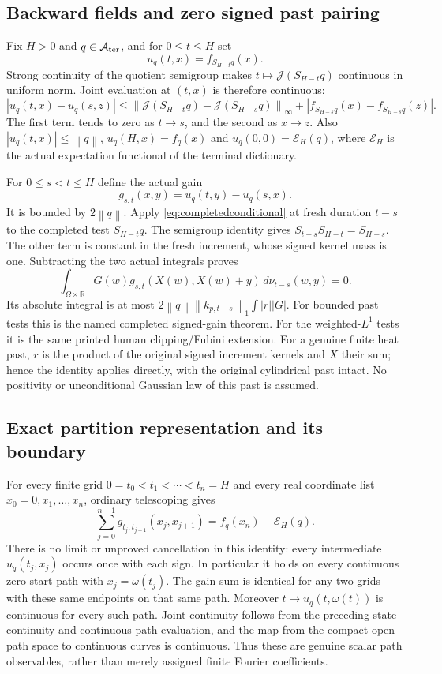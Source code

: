 \documentclass[11pt]{article}
\theoremstyle{remark}\newtheorem{remark}[theorem]{Remark}
\newcommand{\R}{\mathbb R}\newcommand{\C}{\mathbb C}
\newcommand{\A}{\mathcal A}\newcommand{\X}{\mathcal X}
\newcommand{\E}{\mathcal E}\newcommand{\norm}[1]{\left\lVert#1\right\rVert}
\begin{document}
\subsection*{Backward fields and zero signed past pairing}
Fix $H>0$ and $q\in\A_{\rm ter}$, and for $0\leq t\leq H$ set
\[
 u_q(t,x)=f_{S_{H-t}q}(x).
\]
Strong continuity of the quotient semigroup makes
$t\mapsto\mathcal J(S_{H-t}q)$ continuous in uniform norm.
Joint evaluation at $(t,x)$ is therefore continuous:
\[
 |u_q(t,x)-u_q(s,z)|
 \leq\norm{\mathcal J(S_{H-t}q)-\mathcal J(S_{H-s}q)}_\infty
             +|f_{S_{H-s}q}(x)-f_{S_{H-s}q}(z)|.
\]
The first term tends to zero as $t\to s$, and the second as
$x\to z$. Also $|u_q(t,x)|\leq\norm q$,
$u_q(H,x)=f_q(x)$ and
$u_q(0,0)=\E_H(q)$, where $\E_H$ is the actual expectation
functional of the terminal dictionary.

For $0\leq s<t\leq H$ define the actual gain
\[
 g_{s,t}(x,y)=u_q(t,y)-u_q(s,x).
\]
It is bounded by $2\norm q$. Apply
\eqref{eq:completedconditional} at fresh duration $t-s$ to
the completed test $S_{H-t}q$. The semigroup identity gives
$S_{t-s}S_{H-t}=S_{H-s}$. The other term is constant in the
fresh increment, whose signed kernel mass is one. Subtracting
the two actual integrals proves
\begin{equation}\label{eq:completedgainzero}
 \int_{\Omega\times\R}G(w)
       g_{s,t}(X(w),X(w)+y)\,d\nu_{t-s}(w,y)=0.
\end{equation}
Its absolute integral is at most
$2\norm q\norm{k_{p,t-s}}_1\int|r||G|$.
For bounded past tests this is the named completed signed-gain
theorem. For the weighted-$L^1$ tests it is the same printed
human clipping/Fubini extension. For a genuine finite heat past,
$r$ is the product of the original signed increment kernels
and $X$ their sum; hence the identity applies directly, with
the original cylindrical past intact. No positivity or
unconditional Gaussian law of this past is assumed.

\subsection*{Exact partition representation and its boundary}
For every finite grid $0=t_0<t_1<\cdots<t_n=H$ and every
real coordinate list $x_0=0,x_1,\ldots,x_n$, ordinary telescoping
gives
\begin{equation}\label{eq:completedtelescope}
 \sum_{j=0}^{n-1}g_{t_j,t_{j+1}}(x_j,x_{j+1})
       = f_q(x_n)-\E_H(q).
\end{equation}
There is no limit or unproved cancellation in this identity:
every intermediate $u_q(t_j,x_j)$ occurs once with each sign.
In particular it holds on every continuous zero-start path
with $x_j=\omega(t_j)$. The gain sum is identical for any
two grids with these same endpoints on that same path.
Moreover $t\mapsto u_q(t,\omega(t))$ is continuous for every
such path. Joint continuity follows from the preceding
state continuity and continuous path evaluation, and the
map from the compact-open path space to continuous curves
is continuous. Thus these are genuine scalar path observables,
rather than merely assigned finite Fourier coefficients.
\end{document}
